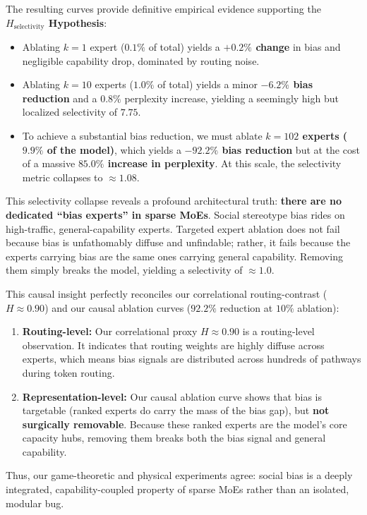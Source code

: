 \documentclass[11pt,a4paper]{article}
\begin{document}
The resulting curves provide definitive empirical evidence supporting the \textbf{$H_{\text{selectivity}}$ Hypothesis}:
\begin{itemize}
    \item Ablating $k=1$ expert ($0.1\%$ of total) yields a \textbf{$+0.2\%$ change} in bias and negligible capability drop, dominated by routing noise.
    \item Ablating $k=10$ experts ($1.0\%$ of total) yields a minor \textbf{$-6.2\%$ bias reduction} and a $0.8\%$ perplexity increase, yielding a seemingly high but localized selectivity of $7.75$.
    \item To achieve a substantial bias reduction, we must ablate \textbf{$k=102$ experts ($9.9\%$ of the model)}, which yields a \textbf{$-92.2\%$ bias reduction} but at the cost of a massive \textbf{$85.0\%$ increase in perplexity}. At this scale, the selectivity metric collapses to \textbf{$\approx 1.08$}.
\end{itemize}

This selectivity collapse reveals a profound architectural truth: \textbf{there are no dedicated ``bias experts'' in sparse MoEs}. Social stereotype bias rides on high-traffic, general-capability experts. Targeted expert ablation does not fail because bias is unfathomably diffuse and unfindable; rather, it fails because the experts carrying bias are the same ones carrying general capability. Removing them simply breaks the model, yielding a selectivity of $\approx 1.0$.

This causal insight perfectly reconciles our correlational routing-contrast ($H \approx 0.90$) and our causal ablation curves ($92.2\%$ reduction at $10\%$ ablation):
\begin{enumerate}
    \item \textbf{Routing-level: } Our correlational proxy $H \approx 0.90$ is a routing-level observation. It indicates that routing weights are highly diffuse across experts, which means bias signals are distributed across hundreds of pathways during token routing.
    \item \textbf{Representation-level: } Our causal ablation curve shows that bias is targetable (ranked experts do carry the mass of the bias gap), but \textbf{not surgically removable}. Because these ranked experts are the model's core capacity hubs, removing them breaks both the bias signal and general capability.
\end{enumerate}
Thus, our game-theoretic and physical experiments agree: social bias is a deeply integrated, capability-coupled property of sparse MoEs rather than an isolated, modular bug.
\end{document}
